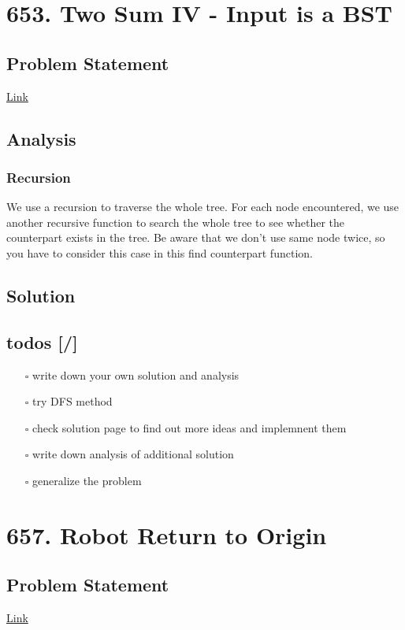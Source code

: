 \documentclass[12pt]{article}
\begin{document}
\section{653. Two Sum IV - Input is a BST}
\label{sec:orga5d5fca}
\subsection{Problem Statement}
\label{sec:orgfafb54f}
\href{https://leetcode.com/problems/two-sum-iv-input-is-a-bst/}{Link}
\subsection{Analysis}
\label{sec:org32b141f}
\subsubsection{Recursion}
\label{sec:org88bbb7d}
We use a recursion to traverse the whole tree. For each node encountered, we use another recursive function to search the whole tree to see whether the counterpart exists in the tree. Be aware that we don't use same node twice, so you have to consider this case in this find counterpart function.


\subsection{Solution}
\label{sec:org66cb097}
\subsection{todos [/]}
\label{sec:orgd21af0e}
\begin{itemize}
\item[{$\square$}] write down your own solution and analysis
\item[{$\square$}] try DFS method
\item[{$\square$}] check solution page to find out more ideas and implemnent them
\item[{$\square$}] write down analysis of additional solution
\item[{$\square$}] generalize the problem
\end{itemize}
\section{657. Robot Return to Origin}
\label{sec:org39b5b20}
\subsection{Problem Statement}
\label{sec:org3cc4249}
\href{https://leetcode.com/problems/robot-return-to-origin/}{Link}
\end{document}
